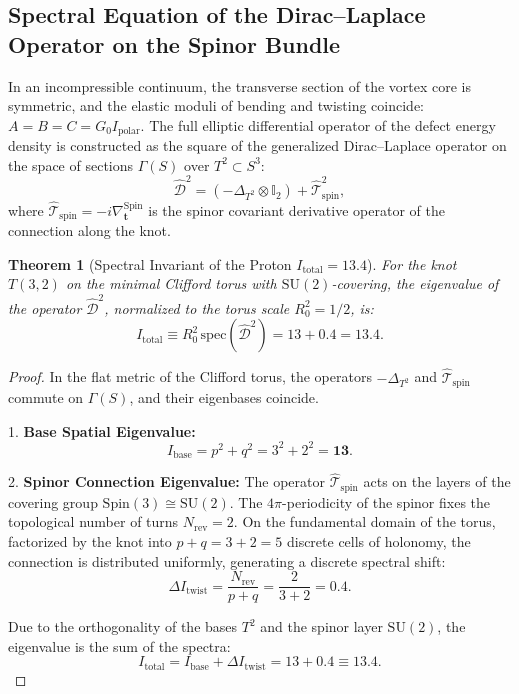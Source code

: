 \documentclass[12pt,a4paper]{article}
\newtheorem{theorem}{Theorem}
\begin{document}
	\subsection{Spectral Equation of the Dirac--Laplace Operator on the Spinor Bundle}
	In an incompressible continuum, the transverse section of the vortex core is symmetric, and the elastic moduli of bending and twisting coincide: $A = B = C = G_0 I_{\text{polar}}$. The full elliptic differential operator of the defect energy density is constructed as the square of the generalized Dirac--Laplace operator on the space of sections $\Gamma(S)$ over $T^2 \subset S^3$:
	\begin{equation}
		\hat{\mathcal{D}}^2 = \left( -\Delta_{T^2} \otimes \mathbb{I}_2 \right) + \hat{\mathcal{T}}_{\text{spin}}^2,
	\end{equation}
	where $\hat{\mathcal{T}}_{\text{spin}} = -i \nabla_{\mathbf{t}}^{\mathrm{Spin}}$ is the spinor covariant derivative operator of the connection along the knot.
	
	\begin{theorem}[Spectral Invariant of the Proton $I_{\mathrm{total}} = 13.4$]
	For the knot $T(3,2)$ on the minimal Clifford torus with $\mathrm{SU}(2)$-covering, the eigenvalue of the operator $\hat{\mathcal{D}}^2$, normalized to the torus scale $R_0^2 = 1/2$, is:
	\begin{equation}
			I_{\mathrm{total}} \equiv R_0^2 \, \mathrm{spec}(\hat{\mathcal{D}}^2) = 13 + 0.4 = \mathbf{13.4}.
	\end{equation}
	\end{theorem}
		
	\begin{proof}
	In the flat metric of the Clifford torus, the operators $-\Delta_{T^2}$ and $\hat{\mathcal{T}}_{\text{spin}}$ commute on $\Gamma(S)$, and their eigenbases coincide.
			
	1. \textbf{Base Spatial Eigenvalue:}
	\begin{equation}
	I_{\text{base}} = p^2 + q^2 = 3^2 + 2^2 = \mathbf{13}.
	\end{equation}
			
	2. \textbf{Spinor Connection Eigenvalue:}
	The operator $\hat{\mathcal{T}}_{\text{spin}}$ acts on the layers of the covering group $\mathrm{Spin}(3) \cong \mathrm{SU}(2)$. The $4\pi$-periodicity of the spinor fixes the topological number of turns $N_{\text{rev}} = 2$. On the fundamental domain of the torus, factorized by the knot into $p + q = 3 + 2 = 5$ discrete cells of holonomy, the connection is distributed uniformly, generating a discrete spectral shift:
	\begin{equation}
	\Delta I_{\text{twist}} = \frac{N_{\text{rev}}}{p + q} = \frac{2}{3 + 2} = \mathbf{0.4}.
	\end{equation}
			
	Due to the orthogonality of the bases $T^2$ and the spinor layer $\mathrm{SU}(2)$, the eigenvalue is the sum of the spectra:
	\begin{equation}
	I_{\mathrm{total}} = I_{\text{base}} + \Delta I_{\text{twist}} = 13 + 0.4 \equiv \mathbf{13.4}.
	\end{equation}
	\end{proof}
		
\end{document}
